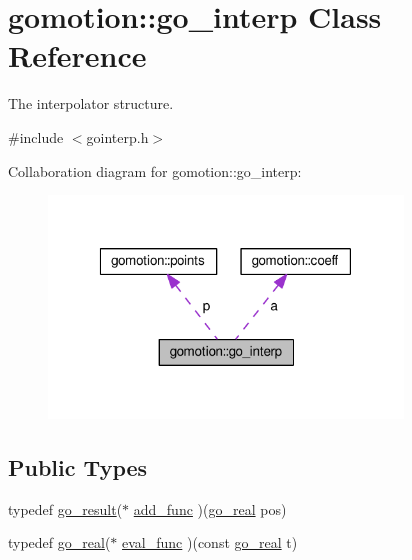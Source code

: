 \hypertarget{classgomotion_1_1go__interp}{\section{gomotion\-:\-:go\-\_\-interp Class Reference}
\label{classgomotion_1_1go__interp}
}


The interpolator structure.  




{\ttfamily \#include $<$gointerp.\-h$>$}



Collaboration diagram for gomotion\-:\-:go\-\_\-interp\-:\nopagebreak
\begin{figure}[H]
\begin{center}
\leavevmode
\includegraphics[width=267pt]{d8/dcd/classgomotion_1_1go__interp__coll__graph}
\end{center}
\end{figure}
\subsection*{Public Types}
\begin{DoxyCompactItemize}
\item 
typedef \hyperlink{gotypes_8h_a55d48b38cd959f63c7e8db8337a9792a}{go\-\_\-result}($\ast$ \hyperlink{classgomotion_1_1go__interp_a2e1c3adf730ce4f1e90ea89b33065d1f}{add\-\_\-func} )(\hyperlink{gotypes_8h_afd666a2393eebd71ee455846ac9def9b}{go\-\_\-real} pos)
\item 
typedef \hyperlink{gotypes_8h_afd666a2393eebd71ee455846ac9def9b}{go\-\_\-real}($\ast$ \hyperlink{classgomotion_1_1go__interp_aace47fd625555ec94aed92da3cc3f9ab}{eval\-\_\-func} )(const \hyperlink{gotypes_8h_afd666a2393eebd71ee455846ac9def9b}{go\-\_\-real} t)
\end{DoxyCompactItemize}
